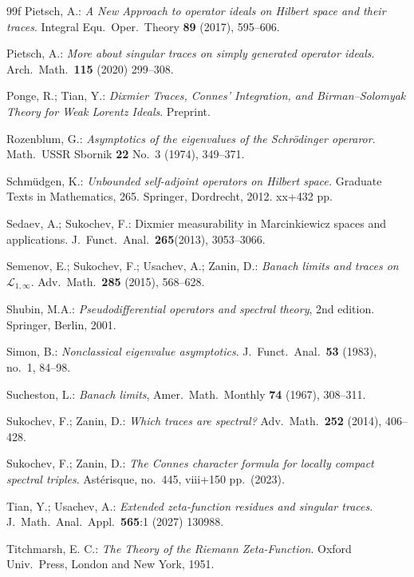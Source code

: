 \documentclass[10pt, a4paper]{amsart}
\newcommand{\sL}{\mathscr{L}}
\numberwithin{equation}{section}
\theoremstyle{definition}
\theoremstyle{remark}
\begin{document}
\begin{thebibliography}{99f}
 Pietsch, A.: \emph{A New Approach to operator ideals on Hilbert space and their traces}. Integral Equ.\  Oper.\ Theory \textbf{89} (2017), 595--606.

 Pietsch, A.: \emph{More about singular traces on simply generated operator ideals}. Arch.\ Math.\  \textbf{115} (2020) 299--308.

 Ponge, R.; Tian, Y.: \emph{Dixmier Traces, Connes' Integration, and Birman--Solomyak Theory for Weak Lorentz Ideals}. Preprint.

 Rozenblum, G.: \emph{Asymptotics of the eigenvalues of the Schr\"odinger operaror}. Math.\ USSR Sbornik \textbf{22} No.\ 3 (1974), 349--371. 

 Schm\"udgen, K.: \emph{Unbounded self-adjoint operators on Hilbert space.} Graduate Texts in Mathematics, 265. Springer, Dordrecht, 2012. xx+432 pp.

 Sedaev, A.; Sukochev, F.: Dixmier measurability in Marcinkiewicz spaces and applications. J.\ Funct.\ Anal.\ \textbf{265}(2013), 3053--3066.

 Semenov, E.; Sukochev, F.; Usachev, A.; Zanin, D.: \emph{Banach limits and traces on $\sL_{1,\infty}$}. Adv.\ Math.\ \textbf{285} (2015), 568--628.

 Shubin, M.A.: \emph{Pseudodifferential operators and spectral theory}, 2nd edition. Springer, Berlin, 2001.

 Simon, B.: \emph{Nonclassical eigenvalue asymptotics}.
J.\ Funct.\ Anal.\ \textbf{53} (1983), no.\ 1, 84--98.

 Sucheston, L.: \emph{Banach limits}, Amer.\  Math.\ Monthly \textbf{74} (1967), 308--311.

 Sukochev, F.; Zanin, D.: \emph{Which traces are spectral?}  Adv.\ Math.\ \textbf{252}
(2014), 406--428.

 Sukochev, F.; Zanin, D.: \emph{The Connes character formula for locally compact spectral triples}. Ast\'erisque, no.\ 445, viii+150 pp.\ (2023).

 Tian, Y.; Usachev, A.: \textit{Extended zeta-function residues and singular traces}. J.\ Math.\ Anal.\ Appl.\ \textbf{565}:1 (2027) 130988.

 Titchmarsh, E. C.: \emph{The Theory of the Riemann Zeta-Function}. Oxford Univ.\
Press, London and New York, 1951.

\end{thebibliography}
\end{document}
